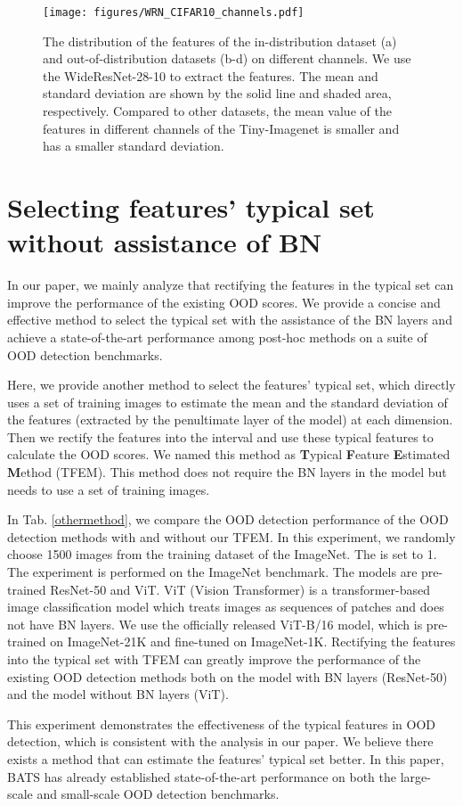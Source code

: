 \documentclass{article}
\begin{document}
\begin{figure}[htbp] 
\centering
\texttt{[image: figures/WRN\_CIFAR10\_channels.pdf]}
\caption{The distribution of the features of the in-distribution dataset (a) and out-of-distribution datasets (b-d) on different channels. We use the WideResNet-28-10 to extract the features. The mean and standard deviation are shown by the solid line and shaded area, respectively. Compared to other datasets, the mean value of the features in different channels of the Tiny-Imagenet is smaller and has a smaller standard deviation.}
\label{img:cifar10_channels}
\end{figure}


{
\section{Selecting features' typical set without assistance of BN}
In our paper, we mainly analyze that rectifying the features in the typical set can improve the performance of the existing OOD scores. We provide a concise and effective method to select the typical set with the assistance of the BN layers and achieve a state-of-the-art performance among post-hoc methods on a suite of OOD detection benchmarks. 

Here, we provide another method to select the features' typical set, which directly uses a set of training images to estimate the mean  and the standard deviation  of the features (extracted by the penultimate layer of the model) at each dimension. Then we rectify the features into the interval  and use these typical features to calculate the OOD scores. We named this method as \textbf{T}ypical \textbf{F}eature \textbf{E}stimated \textbf{M}ethod (TFEM). This method does not require the BN layers in the model but needs to use a set of training images. 

In Tab. \ref{othermethod}, we compare the OOD detection performance of the OOD detection methods with and without our TFEM. In this experiment, we randomly choose 1500 images from the training dataset of the ImageNet. The  is set to 1. The experiment is performed on the ImageNet benchmark. The models are pre-trained ResNet-50 and ViT. ViT (Vision Transformer) \cite{dosovitskiy2020imageVIT} is a transformer-based image classification model which treats images as sequences of patches and does not have BN layers. We use the officially released ViT-B/16 model, which is pre-trained on ImageNet-21K and fine-tuned on ImageNet-1K. Rectifying the features into the typical set with TFEM can greatly improve the performance of the existing OOD detection methods both on the model with BN layers (ResNet-50) and the model without BN layers (ViT).

This experiment demonstrates the effectiveness of the typical features in OOD detection, which is consistent with the analysis in our paper.
We believe there exists a method that can estimate the features' typical set better. In this paper, BATS has already established state-of-the-art performance on both the large-scale and small-scale OOD detection benchmarks.
}
\end{document}
